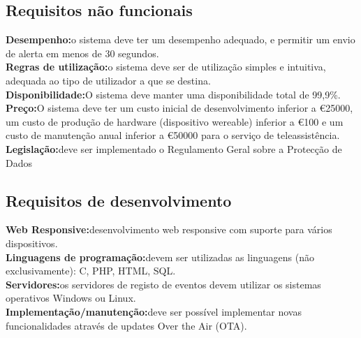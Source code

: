 \subsection{Requisitos não funcionais}
\textbf{Desempenho:}o sistema deve ter um desempenho adequado, e permitir um envio de alerta em menos de 30 segundos.
\\
\textbf{Regras de utilização:}o sistema deve ser de utilização simples e intuitiva, adequada ao tipo de utilizador a que se destina.
\\
\textbf{Disponibilidade:}O sistema deve manter uma disponibilidade total de 99,9\%. 
\\
\textbf{Preço:}O sistema deve ter um custo inicial de desenvolvimento inferior a \euro25000, um custo de produção de hardware (dispositivo wereable) inferior a \euro100 e um custo de manutenção anual inferior a \euro50000 para o serviço de teleassistência.
\\
\textbf{Legislação:}deve ser implementado o Regulamento Geral sobre a Protecção de Dados

\subsection{Requisitos de desenvolvimento}
\textbf{Web Responsive:}desenvolvimento web responsive com suporte para vários dispositivos.
\\
\textbf{Linguagens de programação:}devem ser utilizadas as linguagens (não exclusivamente): C, PHP, HTML, SQL.
\\
\textbf{Servidores:}os servidores de registo de eventos devem utilizar os sistemas operativos Windows ou Linux.
\\
\textbf{Implementação/manutenção:}deve ser possível implementar novas funcionalidades através de updates Over the Air (OTA).
